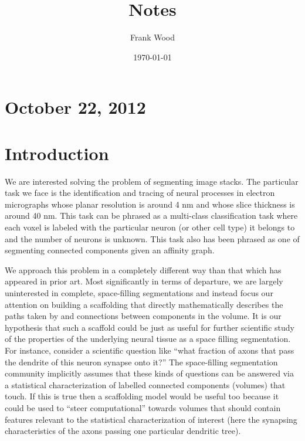 \documentclass{article}
\begin{document}
\title{Notes}
\author{Frank Wood}
\date{\today}
\maketitle
\section*{October 22, 2012}

\section{Introduction}

We are interested solving the problem of segmenting image stacks.  The particular task we face is the identification and tracing of neural processes in electron micrographs whose planar resolution is around 4 nm and whose slice thickness is around 40 nm.   This task can be phrased as a multi-class classification task where each voxel is labeled with the particular neuron (or other cell type) it belongs to and the number of neurons is unknown.   This task also has been phrased as one of segmenting connected components given an affinity graph.

We approach this problem in a completely different way than that which has appeared in prior art.  Most significantly in terms of departure, we are largely uninterested in complete, space-filling segmentations and instead focus our attention on building a scaffolding that directly mathematically describes the paths taken by and connections between components in the volume.  It is our hypothesis that such a scaffold could be just as useful for further scientific study of the properties of the underlying neural tissue as a space filling segmentation.   For instance, consider a scientific question like ``what fraction of axons that pass the dendrite of this neuron synapse onto it?'' The space-filling segmentation community implicitly assumes that these kinds of questions can be answered via a statistical characterization of labelled connected components (volumes) that touch.  If this is true then a scaffolding model would be useful too because it could be used to  ``steer computational''  towards volumes that should contain features relevant to the statistical characterization of interest (here the synapsing characteristics of the axons passing one particular dendritic tree).

\end{document}
